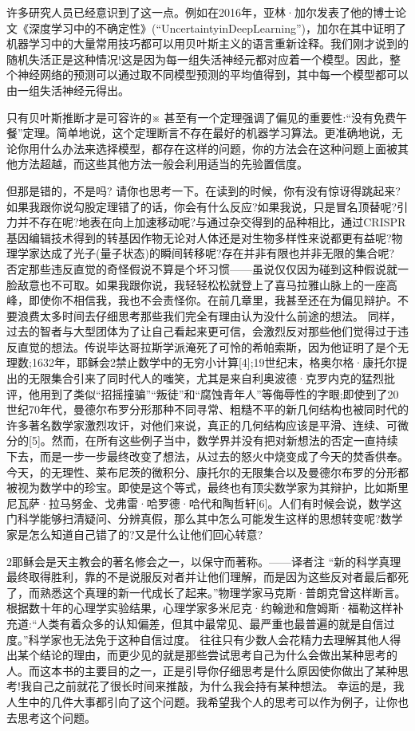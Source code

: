 许多研究人员已经意识到了这一点。例如在2016年，亚林·加尔发表了他的博士论文《深度学习中的不确定性》(“UncertaintyinDeepLearning”)，加尔在其中证明了机器学习中的大量常用技巧都可以用贝叶斯主义的语言重新诠释。我们刚才说到的随机失活正是这种情况!这是因为每一组失活神经元都对应着一个模型。因此，整个神经网络的预测可以通过取不同模型预测的平均值得到，其中每一个模型都可以由一组失活神经元得出。

只有贝叶斯推断才是可容许的※
甚至有一个定理强调了偏见的重要性:“没有免费午餐”定理。简单地说，这个定理断言不存在最好的机器学习算法。更准确地说，无论你用什么办法来选择模型，都存在这样的问题，你的方法会在这种问题上面被其他方法超越，而这些其他方法一般会利用适当的先验置信度。


但那是错的，不是吗?
请你也思考一下。在读到的时候，你有没有惊讶得跳起来?如果我跟你说勾股定理错了的话，你会有什么反应?如果我说，只是冒名顶替呢?引力并不存在呢?地表在向上加速移动呢?与通过杂交得到的品种相比，通过CRISPR基因编辑技术得到的转基因作物无论对人体还是对生物多样性来说都更有益呢?物理学家达成了光子(量子状态)的瞬间转移呢?存在并非有限也并非无限的集合呢?
否定那些违反直觉的奇怪假说不算是个坏习惯——虽说仅仅因为碰到这种假说就一脸敌意也不可取。如果我跟你说，我轻轻松松就登上了喜马拉雅山脉上的一座高峰，即使你不相信我，我也不会责怪你。在前几章里，我甚至还在为偏见辩护。不要浪费太多时间去仔细思考那些我们完全有理由认为没什么前途的想法。
同样，过去的智者与大型团体为了让自己看起来更可信，会激烈反对那些他们觉得过于违反直觉的想法。传说毕达哥拉斯学派淹死了可怜的希帕索斯，因为他证明了是个无理数;1632年，耶稣会2禁止数学中的无穷小计算[4];19世纪末，格奥尔格·康托尔提出的无限集合引来了同时代人的嗤笑，尤其是来自利奥波德·克罗内克的猛烈批评，他用到了类似“招摇撞骗”“叛徒”和“腐蚀青年人”等侮辱性的字眼;即使到了20世纪70年代，曼德尔布罗分形那种不同寻常、粗糙不平的新几何结构也被同时代的许多著名数学家激烈攻讦，对他们来说，真正的几何结构应该是平滑、连续、可微分的[5]。然而，在所有这些例子当中，数学界并没有把对新想法的否定一直持续下去，而是一步一步最终改变了想法，从过去的怒火中烧变成了今天的焚香供奉。今天，的无理性、莱布尼茨的微积分、康托尔的无限集合以及曼德尔布罗的分形都被视为数学中的珍宝。即使是这个等式，最终也有顶尖数学家为其辩护，比如斯里尼瓦萨·拉马努金、戈弗雷·哈罗德·哈代和陶哲轩[6]。人们有时候会说，数学这门科学能够扫清疑问、分辨真假，那么其中怎么可能发生这样的思想转变呢?数学家是怎么知道自己错了的?又是什么让他们回心转意?

2耶稣会是天主教会的著名修会之一，以保守而著称。——译者注
“新的科学真理最终取得胜利，靠的不是说服反对者并让他们理解，而是因为这些反对者最后都死了，而熟悉这个真理的新一代成长了起来。”物理学家马克斯·普朗克曾这样断言。根据数十年的心理学实验结果，心理学家多米尼克·约翰逊和詹姆斯·福勒这样补充道:“人类有着众多的认知偏差，但其中最常见、最严重也最普遍的就是自信过度。”科学家也无法免于这种自信过度。
往往只有少数人会花精力去理解其他人得出某个结论的理由，而更少见的就是那些尝试思考自己为什么会做出某种思考的人。而这本书的主要目的之一，正是引导你仔细思考是什么原因使你做出了某种思考!我自己之前就花了很长时间来推敲，为什么我会持有某种想法。
幸运的是，我人生中的几件大事都引向了这个问题。我希望我个人的思考可以作为例子，让你也去思考这个问题。


